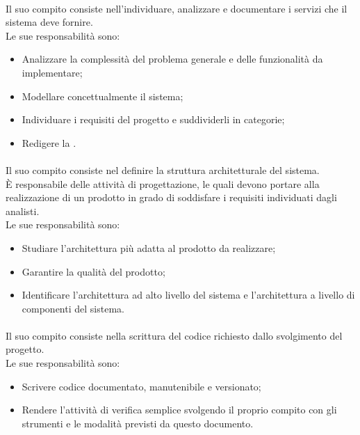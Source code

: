       \paragraph{\roleAnalyst}
        Il suo compito consiste nell'individuare, analizzare e documentare i servizi che il sistema deve fornire.\\
        Le sue responsabilità sono:
        \begin{itemize}
          \item Analizzare la complessità del problema generale e delle funzionalità da implementare;
          \item Modellare concettualmente il sistema;
          \item Individuare i requisiti del progetto e suddividerli in categorie;
          \item Redigere la \docNameVersionAdR{} .
        \end{itemize}
      
      \paragraph{\roleDesigner}
        Il suo compito consiste nel definire la struttura architetturale del sistema.\\
        È responsabile delle attività di progettazione, le quali devono portare alla realizzazione di un prodotto in grado di soddisfare i requisiti individuati dagli analisti.\\
        Le sue responsabilità sono:
        \begin{itemize}
          \item Studiare l'architettura più adatta al prodotto da realizzare;
          \item Garantire la qualità del prodotto;
          \item Identificare l'architettura ad alto livello del sistema e l'architettura a livello di componenti del sistema.
        \end{itemize}

      \paragraph{\roleProgrammer}
        Il suo compito consiste nella scrittura del codice richiesto dallo svolgimento del progetto.\\
        Le sue responsabilità sono:
        \begin{itemize}
          \item Scrivere codice documentato, manutenibile e versionato;
          \item Rendere l'attività di verifica semplice svolgendo il proprio compito con gli strumenti e le modalità previsti da questo documento.
        \end{itemize}

